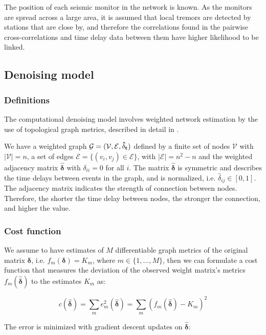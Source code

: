\documentclass[12pt,a4paper,english]{article}
\begin{document}
The position of each seismic monitor in the network is known. As the monitors are spread across a large area, it is assumed that local tremors are detected by stations that are close by, and therefore the correlations found in the pairwise cross-correlations and time delay data between them have higher likelihood to be linked. 

\subsection{Denoising model}\label{sec:denoising}
\subsubsection{Definitions}
The computational denoising model involves weighted network estimation by the use of topological graph metrics, described in detail in \cite{Spyrou2017}. 

We have a weighted graph $\mathcal{G} = (\mathcal{V}, \mathcal{E}, \bf{\hat{\delta}}_t)$ defined by a finite set of nodes $\mathcal{V}$ with $|\mathcal{V}| = n$, a set of edges $\mathcal{E} = \{ (v_i,v_j) \in \mathcal{E} \}$, with $|\mathcal{E}| = n^2-n$ and the weighted adjacency matrix $\bm{\hat{\delta}}$ with $\delta_{ii} = 0$ for all $i$. The matrix $\bm{\hat{\delta}}$  is symmetric and describes the time delays between events in the graph, and is normalized, i.e. $\hat{\delta}_{ij}\in [0,1]$. The adjacency matrix indicates the strength of connection between nodes. Therefore, the shorter the time delay between nodes, the stronger the connection, and higher the value. 

\subsubsection{Cost function}
We assume to have estimates of $M$ differentiable graph metrics of the original matrix $\bm{\delta}$, i.e. $f_m(\bm{\delta}) = K_m$, where $m\in\{ 1,\dots, M \}$, then we can formulate a cost function that measures the deviation of the observed weight matrix's metrics $f_m(\bm{\hat{\delta}})$ to the estimates $K_m$ as: 

\begin{equation}
c(\bm{\hat{\delta}}) = \sum_m e_m^2(\bm{\hat{\delta}}) = \sum_m(f_m(\bm{\hat{\delta}})-K_m)^2
\end{equation}

The error is minimized with gradient descent updates on $\bm{\hat{\delta}}$: 
\end{document}
